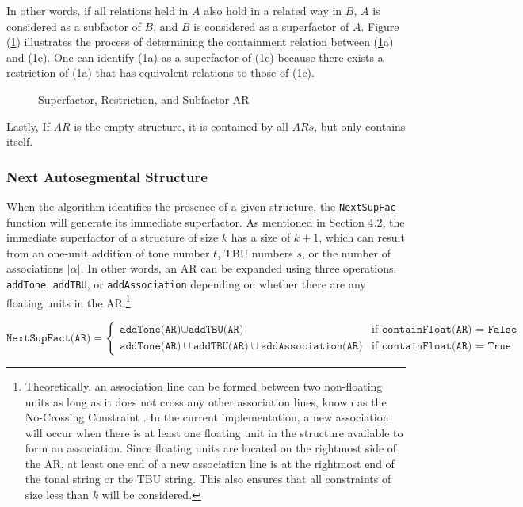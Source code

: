 \documentclass[11pt,letterpaper]{article}
\begin{document}
In other words, if all relations held in \(A\) also hold in a related way in \(B\), \(A\) is considered as a subfactor of \(B\), and \(B\) is considered as a superfactor of \(A\). Figure (\ref{fig:superfactor}) illustrates the process of determining the containment relation between (\ref{fig:superfactor}a) and (\ref{fig:superfactor}c). One can identify (\ref{fig:superfactor}a) as a superfactor of (\ref{fig:superfactor}c) because there exists a restriction of (\ref{fig:superfactor}a) that has equivalent relations to those of (\ref{fig:superfactor}c).

\begin{figure}[ht]
	\centering
	
	\caption{Superfactor, Restriction, and Subfactor AR}
	\label{fig:superfactor}
\end{figure}

Lastly, If $AR$ is the empty structure, it is contained by all $ARs$, but only contains itself. 

\subsubsection{Next Autosegmental Structure}
When the algorithm identifies the presence of a given structure, the \texttt{NextSupFac} function will generate its immediate superfactor. As mentioned in Section 4.2, the immediate superfactor of a structure of size \(k\) has a size of \( k+1 \), which can result from an one-unit addition of tone number \( t \), TBU numbers \( s \), or the number of associations \( \vert \alpha \vert \). In other words, an AR can be expanded using three operations: \texttt{addTone}, \texttt{addTBU}, or \texttt{addAssociation} depending on whether there are any floating units in the AR.\footnote{Theoretically, an association line can be formed between two non-floating units as long as it does not cross any other association lines, known as the No-Crossing Constraint \citep{goldsmith1976autosegmental, coleman1991no, hammond1988deriving}. In the current implementation, a new association will occur when there is at least one floating unit in the structure available to form an association. Since floating units are located on the rightmost side of the AR, at least one end of a new association line is at the rightmost end of the tonal string or the TBU string. This also ensures that all constraints of size less than $k$ will be considered.}

\[
\texttt{NextSupFact(AR)} =
\begin{cases}
	\texttt{addTone(AR)} \cup \texttt{addTBU(AR)} & \text{if } \texttt{containFloat(AR) = False} \\
	\texttt{addTone(AR)} \cup \texttt{addTBU(AR)} \cup \texttt{addAssociation(AR)} & \text{if } \texttt{containFloat(AR) = True}
\end{cases}
\]
\end{document}
